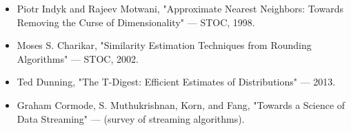 \begin{itemize}
\item Piotr Indyk and Rajeev Motwani, "Approximate Nearest Neighbors: Towards Removing the Curse of Dimensionality" — STOC, 1998.
\item Moses S. Charikar, "Similarity Estimation Techniques from Rounding Algorithms" — STOC, 2002.
\item Ted Dunning, "The T-Digest: Efficient Estimates of Distributions" — 2013.
\item Graham Cormode, S. Muthukrishnan, Korn, and Fang, "Towards a Science of Data Streaming" — (survey of streaming algorithms).
\end{itemize}
